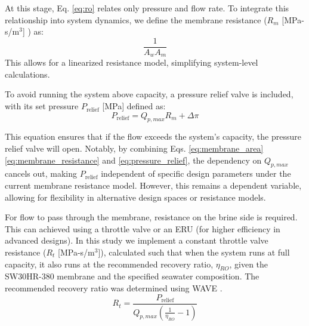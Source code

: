 \documentclass[twocolumn,10pt]{asme2e}
\begin{document}
At this stage, Eq. \ref{eq:ro} relates only pressure and flow rate. To integrate this relationship into system dynamics, we define the membrane resistance ($R_m$ [MPa-s/m$^3$] ) as:
\begin{equation}
    \frac{1}{A_w A_m}
    \label{eq:membrane_resistance}
\end{equation}
\noindent This allows for a linearized resistance model, simplifying system-level calculations.

To avoid running the system above capacity, a pressure relief valve is included, with its set pressure $P_{\text{relief}}$ [MPa] defined as:
\begin{equation}
    P_{\text{relief}} = Q_{p,max}R_m + \Delta \pi
    \label{eq:pressure_relief}
\end{equation}

This equation ensures that if the flow exceeds the system's capacity, the pressure relief valve will open. Notably, by combining Eqs. \ref{eq:membrane_area} \ref{eq:membrane_resistance} and \ref{eq:pressure_relief}, the dependency on $Q_{p,max}$ cancels out, making $P_{\text{relief}}$ independent of specific design parameters under the current membrane resistance model. However, this remains a dependent variable, allowing for flexibility in alternative design spaces or resistance models.

For flow to pass through the membrane, resistance on the brine side is required. This can achieved using a throttle valve or an ERU (for higher efficiency in advanced designs). In this study we implement a constant throttle valve resistance ($R_t$ [MPa-s/m$^3$]), calculated such that when the system runs at full capacity, it also runs at the recommended recovery ratio, $\eta_{RO}$, given the SW30HR-380 membrane and the specified seawater composition. The recommended recovery ratio was determined using WAVE \cite{wave}.
\begin{equation}
    R_t = \frac{P_{\text{relief}}}{Q_{p,max}(\frac{1}{\eta_{RO}} - 1)}
\end{equation}
\end{document}
